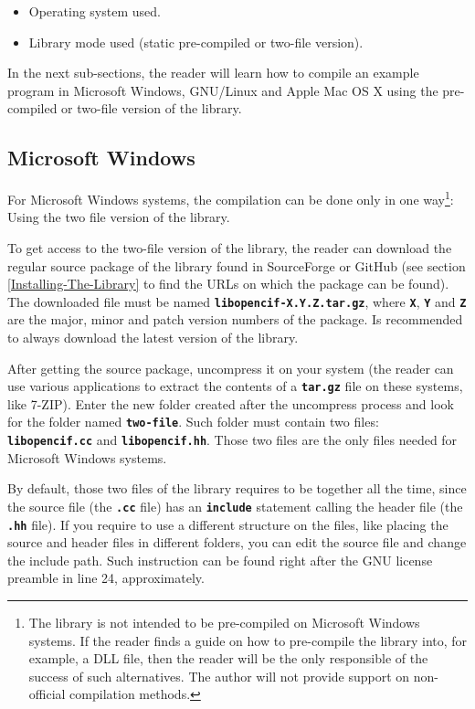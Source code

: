 \documentclass[11pt,twoside,openany,x11names,svgnames]{memoir}
\begin{document}
\begin{itemize}
	\item Operating system used.
	\item Library mode used (static pre-compiled or two-file version).
\end{itemize}

In the next sub-sections, the reader will learn how to compile an example program in Microsoft Windows, GNU/Linux and Apple Mac OS X using the pre-compiled or two-file version of the library.

\subsection{Microsoft Windows}\label{Compiling-On-Windows}
 
For Microsoft Windows systems, the compilation can be done only in one way\footnote{The library is not intended to be pre-compiled on Microsoft Windows systems. If the reader finds a guide on how to pre-compile the library into, for example, a DLL file, then the reader will be the only responsible of the success of such alternatives. The author will not provide support on non-official compilation methods.}: Using the two file version of the library.

To get access to the two-file version of the library, the reader can download the regular source package of the library found in SourceForge or GitHub (see section \ref{Installing-The-Library} to find the URLs on which the package can be found). The downloaded file must be named \textbf{\texttt{libopencif-X.Y.Z.tar.gz}}, where \textbf{\texttt{X}}, \textbf{\texttt{Y}} and \textbf{\texttt{Z}} are the major, minor and patch version numbers of the package. Is recommended to always download the latest version of the library.

After getting the source package, uncompress it on your system (the reader can use various applications to extract the contents of a \textbf{\texttt{tar.gz}} file on these systems, like 7-ZIP). Enter the new folder created after the uncompress process and look for the folder named \textbf{\texttt{two-file}}. Such folder must contain two files: \textbf{\texttt{libopencif.cc}} and \textbf{\texttt{libopencif.hh}}. Those two files are the only files needed for Microsoft Windows systems.

By default, those two files of the library requires to be together all the time, since the source file (the \textbf{\texttt{.cc}} file) has an \textbf{\texttt{include}} statement calling the header file (the \textbf{\texttt{.hh}} file). If you require to use a different structure on the files, like placing the source and header files in different folders, you can edit the source file and change the include path. Such instruction can be found right after the GNU license preamble in line 24, approximately.
\end{document}
